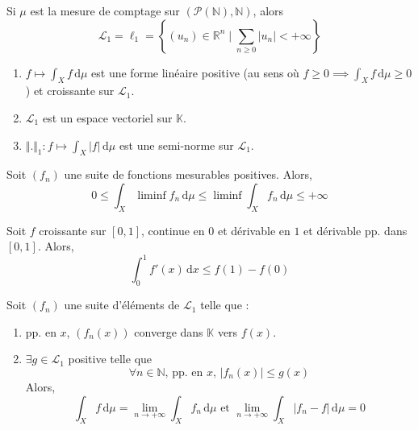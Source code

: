   \begin{example}
    Si $\mu$ est la mesure de comptage sur $(\mathcal{P}(\mathbb{N}), \mathbb{N})$, alors
    \[ \mathcal{L}_1 = \ell_1 = \left\{ (u_n) \in \mathbb{R}^n \mid \sum_{n \geq 0} \vert u_n \vert < +\infty \right\} \]
  \end{example}

  \begin{theorem}
    \begin{enumerate}[label=(\roman*)]
      \item $f \mapsto \int_X f \, \mathrm{d}\mu$ est une forme linéaire positive (au sens où $f \geq 0 \implies \int_X f \, \mathrm{d}\mu \geq 0$) et croissante sur $\mathcal{L}_1$.
      \item $\mathcal{L}_1$ est un espace vectoriel sur $\mathbb{K}$.
      \item $\Vert . \Vert_1 : f \mapsto \int_X \vert f \vert \, \mathrm{d}\mu$ est une semi-norme sur $\mathcal{L}_1$.
    \end{enumerate}
  \end{theorem}


  \begin{theorem}
    Soit $(f_n)$ une suite de fonctions mesurables positives. Alors,
    \[ 0 \leq \int_X \liminf f_n \, \mathrm{d}\mu \leq \liminf \int_X f_n \, \mathrm{d}\mu \leq +\infty \]
  \end{theorem}

  \begin{example}
    \label{234-2}
    Soit $f$ croissante sur $[0,1]$, continue en $0$ et dérivable en $1$ et dérivable pp. dans $[0,1]$. Alors,
    \[ \int_{0}^{1} f'(x) \, \mathrm{d}x \leq f(1) - f(0) \]
  \end{example}

  \begin{theorem}
    Soit $(f_n)$ une suite d'éléments de $\mathcal{L}_1$ telle que :
    \begin{enumerate}[label=(\roman*)]
      \item pp. en $x$, $(f_n(x))$ converge dans $\mathbb{K}$ vers $f(x)$.
      \item $\exists g \in \mathcal{L}_1$ positive telle que
      \[ \forall n \in \mathbb{N}, \, \text{pp. en } x, \, \vert f_n(x) \vert \leq g(x) \]
      Alors,
      \[ \int_X f \, \mathrm{d}\mu = \lim_{n \rightarrow +\infty} \int_X f_n \, \mathrm{d}\mu \text{ et } \lim_{n \rightarrow +\infty} \int_X \vert f_n - f \vert \, \mathrm{d}\mu = 0 \]
    \end{enumerate}
  \end{theorem}

